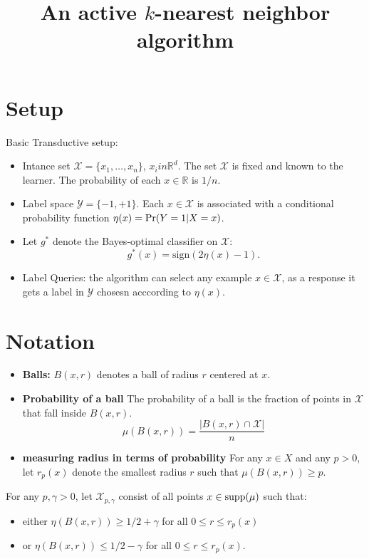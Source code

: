 \documentclass{article}
\title{An active $k$-nearest neighbor algorithm}
\def\R{{\mathbb{R}}}
\def\pr{{\rm Pr}}
\def\X{{\mathcal X}}
\def\Y{{\mathcal Y}}
\def\supp{{\rm supp}}
\begin{document}
\maketitle

\section{Setup}

Basic Transductive setup:
\begin{itemize}
\item Intance set $\X =\{x_1,\dots,x_n\}$, $x_i in \R^d$. The set $\X$
  is fixed and known to the learner. The probability of each $x \in
  \R$ is $1/n$. 
\item Label space $\Y = \{-1,+1\}$. Each $x \in \X$ is associated with
  a conditional probability function $\eta(x) = \pr(Y=1|X=x)$.
\item Let $g^*$ denote the Bayes-optimal classifier on $\X$:
  $$ g^*(x) = \mbox{sign}(2 \eta(x) - 1) .$$
  \item Label Queries: the algorithm can select any example $x \in
    \X$, as a response it gets a label in $\Y$ chosesn acccording to
    $\eta(x)$.    
  \end{itemize}

\section{Notation}
\begin{itemize}
  \item {\bf Balls:} $B(x,r)$ denotes a ball of radius $r$ centered at $x$.
  \item {\bf Probability of a ball} The probability of a ball is the
    fraction of points in $\X$ that fall inside $B(x,r)$.
    $$ \mu(B(x,r)) = \frac{ |B(x,r) \cap \X|}{n} $$
  \item {\bf measuring radius in terms of probability}
For any $x \in X$ and any $p > 0$, let $r_p(x)$ denote the smallest radius $r$ such that $\mu(B(x, r)) \geq p$. 
\end{itemize}

For any $p, \gamma> 0$, let $\X_{p, \gamma}$ consist of all points $x \in \supp(\mu)$ such that:
\begin{itemize}
\item either $\eta(B(x,r)) \geq 1/2 + \gamma$ for all $0 \leq r \leq r_p(x)$ 
\item or $\eta(B(x,r)) \leq 1/2 - \gamma$ for all $0 \leq r \leq r_p(x)$.
\end{itemize}
\end{document}
